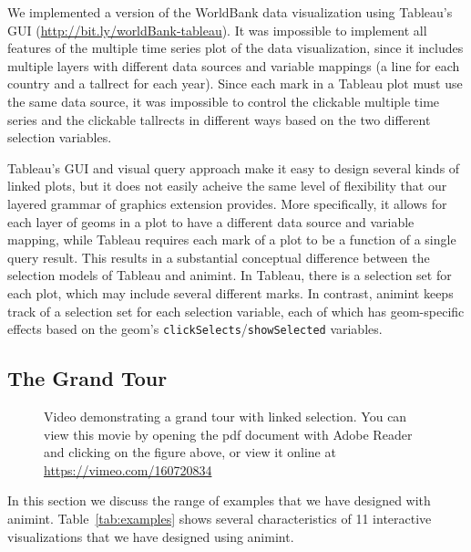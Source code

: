 \documentclass[journal]{vgtc}\usepackage[]{graphicx}\usepackage[]{color}
\begin{document}
We implemented a version of the WorldBank data visualization using
Tableau's GUI (\url{http://bit.ly/worldBank-tableau}).
It was impossible to implement all features of the multiple time
series plot of the data visualization, since it includes multiple
layers with different data sources and variable mappings (a line for
each country and a tallrect for each year). Since each mark in a
Tableau plot must use the same data source, it was impossible to
control the clickable multiple time series and the clickable tallrects
in different ways based on the two different selection variables.

Tableau's GUI and visual query approach
make it easy to design several kinds of linked plots, but it does not
easily acheive the same level of flexibility that our
layered grammar of graphics extension provides. More specifically, it allows
for each layer of geoms in a plot to have a different data source and
variable mapping, while Tableau requires each mark of a plot to be a
function of a single query result. This results in a substantial
conceptual difference between the selection models of Tableau and animint. In Tableau, there is a selection set for each plot, which may
include several different marks. In contrast, animint keeps track of a
selection set for each selection variable, each of which has
geom-specific effects based on the geom's \texttt{clickSelects}/\texttt{showSelected}
variables.

\subsection{The Grand Tour}

\begin{figure}[htp]
	\centerline{}
	\label{fig:tour}
	\caption{Video demonstrating a grand tour with linked selection. You can view this movie by opening the pdf document with Adobe Reader and clicking on the figure above, or view it online at \url{https://vimeo.com/160720834}}
\end{figure}


In this section we discuss the range of examples that we have designed
with animint. Table~\ref{tab:examples} shows several characteristics
of 11 interactive visualizations that we have designed using
animint.
\end{document}
